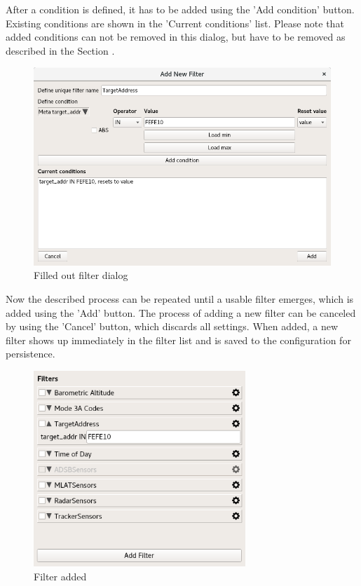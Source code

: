 \documentclass[10pt,letterpaper,extrafontsizes]{memoir}
\begin{document}
After a condition is defined, it has to be added using the 'Add condition' button. Existing conditions are
shown in the 'Current conditions' list. Please note that added conditions can not be removed in this dialog,
but have to be removed as described in the Section .

\begin{figure}[H]
  \center
    \includegraphics[width=14cm]{../screenshots/filter_add2.png}
  \caption{Filled out filter dialog}
  \label{fig:filter_add2}
\end{figure}

Now the described process can be repeated until a usable filter emerges, which is added using the 'Add'
button. The process of adding a new filter can be canceled by using the 'Cancel' button, which discards all
settings. When added, a new filter shows up immediately in the filter list and is saved to the configuration
for persistence.

\begin{figure}[H]
  \center
    \includegraphics[width=8cm]{../screenshots/filter_add3.png}
  \caption{Filter added}
  \label{fig:filter_add3}
\end{figure}
\end{document}
